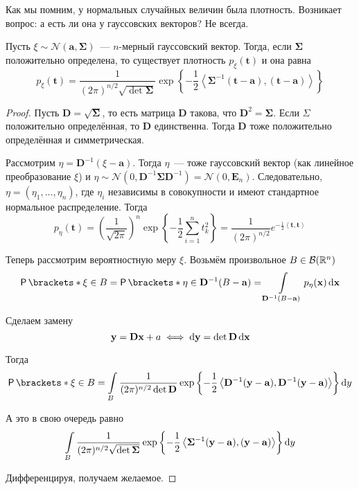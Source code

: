 Как мы помним, у нормальных случайных величин была плотность. Возникает вопрос: а есть ли она у гауссовских векторов? Не всегда.
\begin{theorem}
	Пусть \(\xi \sim \mathcal{N}(\mathbf{a}, \mathbf{\Sigma})\)~--- \(n\)-мерный гауссовский вектор. Тогда, если \(\mathbf{\Sigma}\) положительно определена, то существует плотность \(p_{\xi}(\mathbf{t})\) и она равна
	\[
		p_{\xi}(\mathbf{t}) = \frac{1}{(2\pi)^{n/2}\sqrt{\det{\mathbf{\Sigma}}}}\exp\left\{-\frac{1}{2}\left\langle\mathbf{\Sigma}^{-1}(\mathbf{t} - \mathbf{a}), (\mathbf{t} - \mathbf{a})\right\rangle\right\}
	\]
\end{theorem}
\begin{proof}
	Пусть \(\mathbf{D} = \sqrt{\mathbf{\Sigma}}\), то есть матрица \(\mathbf{D}\) такова, что \(\mathbf{D}^2 = \mathbf{\Sigma}\). Если \(\Sigma\) положительно определённая, то \(\mathbf{D}\) единственна. Тогда \(\mathbf{D}\) тоже положительно определённая и симметрическая.
	
	Рассмотрим \(\eta = \mathbf{D}^{-1}(\xi - \mathbf{a})\). Тогда \(\eta\)~--- тоже гауссовский вектор (как линейное преобразование \(\xi\)) и \(\eta \sim \mathcal{N}(0, \mathbf{D}^{-1}\mathbf{\Sigma}\mathbf{D}^{-1}) = \mathcal{N}(0, \mathbf{E}_n)\). Следовательно, \(\eta = (\eta_1, \dots, \eta_n)\), где \(\eta_i\) независимы в совокупности и имеют стандартное нормальное распределение. Тогда
	\[
		p_{\eta}(\mathbf{t}) = \left(\frac{1}{\sqrt{2\pi}}\right)^{n}\exp\left\{-\frac{1}{2}\sum_{i = 1}^{n}t_k^2\right\} = \frac{1}{(2\pi)^{n/2}}e^{-\frac{1}{2}\left\langle\mathbf{t}, \mathbf{t}\right\rangle}
	\]
	
	Теперь рассмотрим вероятностную меру \(\xi\). Возьмём произвольное \(B \in \mathcal{B}(\mathbb{R}^n)\)
	\begin{align*}
		\Pr{\xi \in B} = \Pr{\eta \in \mathbf{D}^{-1}(B - \mathbf{a})} = \int\limits_{\mathbf{D}^{-1}(B - \mathbf{a})} p_{\eta}(\mathbf{x})\diff \mathbf{x}
	\end{align*}
	
	Сделаем замену
	\[
		\mathbf{y} = \mathbf{Dx} + a \iff \mathop{}\!\mathrm{d} \mathbf{y} = \det{\mathbf{D}}\mathop{}\!\mathrm{d}\mathbf{x}
	\]
	
	Тогда
	\[
		\Pr{\xi \in B} = \int\limits_{B} \frac{1}{(2\pi)^{n/2}\det{\mathbf{D}}}\exp\left\{-\frac{1}{2}\left\langle\mathbf{D}^{-1}(\mathbf{y} - \mathbf{a}), \mathbf{D}^{-1}(\mathbf{y} - \mathbf{a})\right\rangle\right\}\diff y
	\]
	
	А это в свою очередь равно
	\[
		\int\limits_{B} \frac{1}{(2\pi)^{n/2}\sqrt{\det{\mathbf{\Sigma}}}}\exp\left\{-\frac{1}{2}\left\langle\mathbf{\Sigma}^{-1}(\mathbf{y} - \mathbf{a}), (\mathbf{y} - \mathbf{a})\right\rangle\right\}\mathop{}\!\mathrm{d} y
	\]
	
	Дифференцируя, получаем желаемое.
\end{proof}

